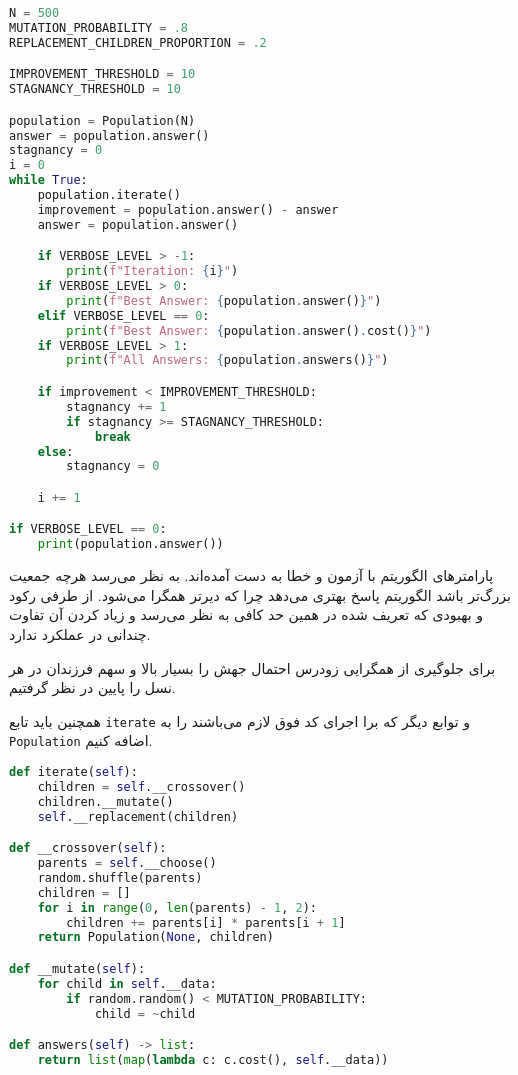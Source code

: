 \documentclass[a4paper, 12pt]{article}
\theoremstyle{definition}
\begin{document}
\LTR
\begin{lstlisting}[language=Python]
N = 500
MUTATION_PROBABILITY = .8
REPLACEMENT_CHILDREN_PROPORTION = .2

IMPROVEMENT_THRESHOLD = 10
STAGNANCY_THRESHOLD = 10

population = Population(N)
answer = population.answer()
stagnancy = 0
i = 0
while True:
    population.iterate()
    improvement = population.answer() - answer
    answer = population.answer()

    if VERBOSE_LEVEL > -1:
        print(f"Iteration: {i}")
    if VERBOSE_LEVEL > 0:
        print(f"Best Answer: {population.answer()}")
    elif VERBOSE_LEVEL == 0:
        print(f"Best Answer: {population.answer().cost()}")
    if VERBOSE_LEVEL > 1:
        print(f"All Answers: {population.answers()}")

    if improvement < IMPROVEMENT_THRESHOLD:
        stagnancy += 1
        if stagnancy >= STAGNANCY_THRESHOLD:
            break
    else:
        stagnancy = 0

    i += 1

if VERBOSE_LEVEL == 0:
    print(population.answer())    
\end{lstlisting}
\RTL

پارامترهای الگوریتم با آزمون و خطا به دست آمده‌اند. به نظر می‌رسد هرچه جمعیت بزرگ‌تر باشد الگوریتم پاسخ بهتری می‌دهد چرا که دیرتر همگرا می‌شود. از طرفی رکود و بهبودی که تعریف شده در همین حد کافی به نظر می‌رسد و زیاد کردن آن تفاوت چندانی در عملکرد ندارد.

برای جلوگیری از همگرایی زودرس احتمال جهش را بسیار بالا و سهم فرزندان در هر نسل را پایین در نظر گرفتیم.

همچنین باید تابع
\texttt{iterate}
و توابع دیگر که برا اجرای کد فوق لازم می‌باشند را به
\texttt{Population}
اضافه کنیم.

\LTR
\begin{lstlisting}[language=Python]
def iterate(self):
    children = self.__crossover()
    children.__mutate()
    self.__replacement(children)

def __crossover(self):
    parents = self.__choose()
    random.shuffle(parents)
    children = []
    for i in range(0, len(parents) - 1, 2):
        children += parents[i] * parents[i + 1]
    return Population(None, children)

def __mutate(self):
    for child in self.__data:
        if random.random() < MUTATION_PROBABILITY:
            child = ~child

def answers(self) -> list:
    return list(map(lambda c: c.cost(), self.__data))
\end{lstlisting}
\RTL
\end{document}
